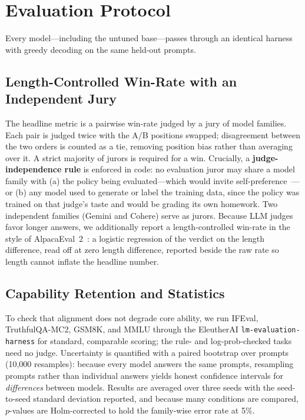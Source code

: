 \documentclass[conference]{IEEEtran}
\begin{document}
\section{Evaluation Protocol}
\label{sec:eval}
Every model---including the untuned base---passes through an identical harness with
greedy decoding on the same held-out prompts.

\subsection{Length-Controlled Win-Rate with an Independent Jury}
The headline metric is a pairwise win-rate judged by a jury of model families.
Each pair is judged twice with the A/B positions swapped; disagreement between the
two orders is counted as a tie, removing position bias rather than averaging over
it. A strict majority of jurors is required for a win. Crucially, a
\textbf{judge-independence rule} is enforced in code: no evaluation juror may share
a model family with (a) the policy being evaluated---which would invite
self-preference~\cite{zheng2023judge}---or (b) any model used to generate or label
the training data, since the policy was trained on that judge's taste and would be
grading its own homework. Two independent families (Gemini and Cohere) serve as
jurors. Because LLM judges favor longer answers, we additionally report a
length-controlled win-rate in the style of AlpacaEval~2~\cite{dubois2024alpaca}: a
logistic regression of the verdict on the length difference, read off at zero
length difference, reported beside the raw rate so length cannot inflate the
headline number.

\subsection{Capability Retention and Statistics}
To check that alignment does not degrade core ability, we run IFEval,
TruthfulQA-MC2, GSM8K, and MMLU through the EleutherAI
\texttt{lm-evaluation-harness} for standard, comparable scoring; the rule- and
log-prob-checked tasks need no judge. Uncertainty is quantified with a paired
bootstrap over prompts (10{,}000 resamples): because every model answers the same
prompts, resampling prompts rather than individual answers yields honest
confidence intervals for \emph{differences} between models. Results are averaged
over three seeds with the seed-to-seed standard deviation reported, and because
many conditions are compared, $p$-values are Holm-corrected to hold the
family-wise error rate at 5\%.
\end{document}
